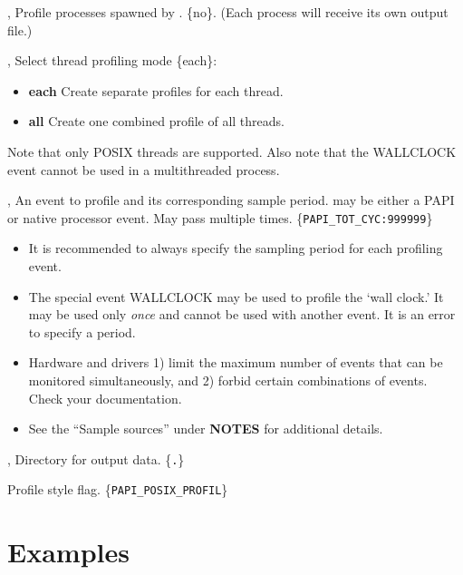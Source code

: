 \documentclass[english]{article}
\begin{document}
\begin{Description}
  \item[\OptoArg{-r}{yes \Bar no}, \OptoArg{--recursive}{yes \Bar no}]
  Profile processes spawned by .  \{no\}.  (Each process will receive its own output file.)

  \item[\OptArg{-t}{mode}, \OptArg{--threads}{mode}]
   Select thread profiling mode \{each\}:
  \begin{itemize}
    \item \textbf{each} Create separate profiles for each thread.
    \item \textbf{all} Create one combined profile of all threads.
  \end{itemize}
  Note that only POSIX threads are supported.
  Also note that the WALLCLOCK event cannot be used in a multithreaded process.

  \item[\OptArg{-e}{event\Lbr:period\Rbr}, \OptArg{--event}{event\Lbr:period\Rbr}] 
   An event to profile and its corresponding sample period.  may be either a PAPI or native processor event. May pass multiple times.  \{\verb+PAPI_TOT_CYC:999999+\} 
  \begin{itemize}
    \item It is recommended to always specify the sampling period for each profiling event.
    \item The special event WALLCLOCK may be used to profile the `wall clock.'  It may be used only \emph{once} and cannot be used with another event. It is an error to specify a period.
    \item Hardware and drivers 1) limit the maximum number of events that can be monitored simultaneously, and 2) forbid certain combinations of events.  Check your documentation.
    \item See the ``Sample sources'' under \textbf{NOTES} for additional details.
  \end{itemize}
  \item[\OptoArg{-o}{outpath}, \OptoArg{--output}{outpath}] Directory for output data.  \{\texttt{.}\}
  \item[\OptArg{--papi-flag}{flag}] Profile style flag.  \{\verb+PAPI_POSIX_PROFIL+\}
\end{Description}


\section{Examples}
\end{document}
